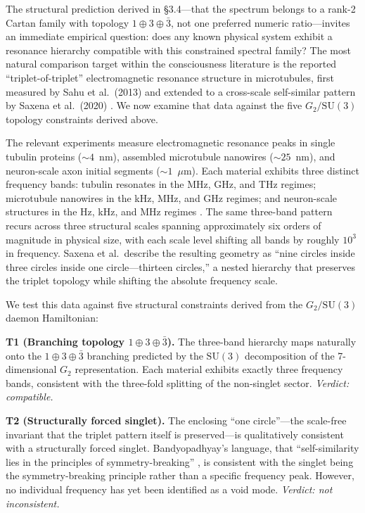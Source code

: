 \documentclass[12pt,a4paper]{article}
\begin{document}
The structural prediction derived in \S3.4---that the spectrum belongs to a rank-2 Cartan family with topology $1 \oplus 3 \oplus \bar{3}$, not one preferred numeric ratio---invites an immediate empirical question: does any known physical system exhibit a resonance hierarchy compatible with this constrained spectral family? The most natural comparison target within the consciousness literature is the reported ``triplet-of-triplet'' electromagnetic resonance structure in microtubules, first measured by Sahu et al.\ (2013) and extended to a cross-scale self-similar pattern by Saxena et al.\ (2020) \citep{Sahu2013,Saxena2020}. We now examine that data against the five $G_2/\mathrm{SU}(3)$ topology constraints derived above.

The relevant experiments measure electromagnetic resonance peaks in single tubulin proteins (${\sim}4$~nm), assembled microtubule nanowires (${\sim}25$~nm), and neuron-scale axon initial segments (${\sim}1$~$\mu$m). Each material exhibits three distinct frequency bands: tubulin resonates in the MHz, GHz, and THz regimes; microtubule nanowires in the kHz, MHz, and GHz regimes; and neuron-scale structures in the Hz, kHz, and MHz regimes \citep{Saxena2020}. The same three-band pattern recurs across three structural scales spanning approximately six orders of magnitude in physical size, with each scale level shifting all bands by roughly $10^3$ in frequency. Saxena et al.\ describe the resulting geometry as ``nine circles inside three circles inside one circle---thirteen circles,'' a nested hierarchy that preserves the triplet topology while shifting the absolute frequency scale.

We test this data against five structural constraints derived from the $G_2/\mathrm{SU}(3)$ daemon Hamiltonian:

\textbf{T1 (Branching topology $1 \oplus 3 \oplus \bar{3}$).} The three-band hierarchy maps naturally onto the $1 \oplus 3 \oplus \bar{3}$ branching predicted by the $\mathrm{SU}(3)$ decomposition of the 7-dimensional $G_2$ representation. Each material exhibits exactly three frequency bands, consistent with the three-fold splitting of the non-singlet sector. \textit{Verdict: compatible.}

\textbf{T2 (Structurally forced singlet).} The enclosing ``one circle''---the scale-free invariant that the triplet pattern itself is preserved---is qualitatively consistent with a structurally forced singlet. Bandyopadhyay's language, that ``self-similarity lies in the principles of symmetry-breaking'' \citep{Saxena2020}, is consistent with the singlet being the symmetry-breaking principle rather than a specific frequency peak. However, no individual frequency has yet been identified as a void mode. \textit{Verdict: not inconsistent.}
\end{document}
